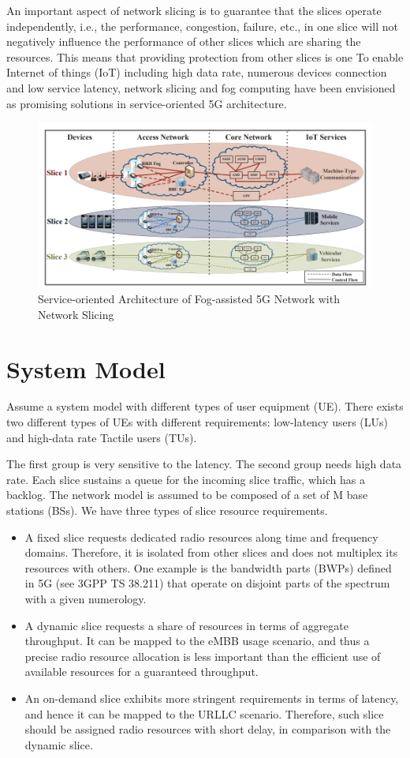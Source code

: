 \documentclass{article}
\begin{document}
An important aspect of network slicing is to guarantee that
the slices operate independently, i.e., the performance, congestion, failure, etc., in one slice will not negatively influence the
performance of other slices which are sharing the resources.
This means that providing protection from other slices is one
To enable Internet of things (IoT) including high data rate, numerous devices
connection and low service latency,
network slicing and fog computing have been envisioned as
promising solutions in service-oriented 5G architecture.
\begin{figure}[h!]
\centering
\includegraphics[scale=0.5]{Capture.PNG}
\caption{ Service-oriented Architecture of Fog-assisted 5G Network with Network Slicing}
\label{fig:FogNS}
\end{figure}
\section{System Model}
Assume a system model with different types of user equipment (UE).
There exists two different types of
UEs with different requirements: low-latency users (LUs) and
high-data rate Tactile users (TUs).

The first group is very sensitive to the latency. The second group needs high data rate.
Each slice sustains a queue
for the incoming slice traffic, which has a backlog.
The network model is assumed to be composed of a set of M
base stations (BSs).
We have three types of slice resource requirements.
\begin{itemize}
\item A fixed slice requests dedicated radio resources along
time and frequency domains. Therefore, it is isolated
from other slices and does not multiplex its resources
with others. One example is the bandwidth parts (BWPs)
defined in 5G (see 3GPP TS 38.211) that operate on
disjoint parts of the spectrum with a given numerology.
\item A dynamic slice requests a share of resources in terms
of aggregate throughput. It can be mapped to the eMBB
usage scenario, and thus a precise radio resource allocation is less important than the efficient use of available
resources for a guaranteed throughput.
\item An on-demand slice exhibits more stringent requirements
in terms of latency, and hence it can be mapped to
the URLLC scenario. Therefore, such slice should be
assigned radio resources with short delay, in comparison
with the dynamic slice.\citep{schmidt2019slice}
\end{itemize}
\end{document}
